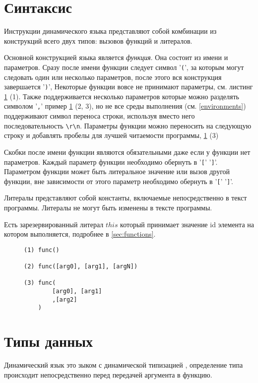\documentclass[../index.tex]{subfiles}
\begin{document}
\section{Синтаксис}

Инструкции динамического языка представляют собой комбинации из конструкций всего двух типов: вызовов функций и литералов.

Основной конструкцией языка является \textit{функция}. Она состоит из имени и параметров. 
Сразу после имени функции следует символ '\verb|(|', за которым могут следовать один или 
несколько параметров, после этого вся конструкция завершается '\verb|)|', 
Некоторые функции вовсе не принимают параметры, см. листинг \ref{lst:lecsic} (1). 
Также поддерживается несколько параметров которые можно разделять символом '\verb|,|'
пример \ref{lst:lecsic} (2, 3), но не все среды выполнения (см. \autoref{environments}) 
поддерживают символ переноса строки, используя вместо него последовательность \verb|\r\n|.
Параметры функции можно переносить на следующую строку и добавлять пробелы для 
лучшей читаемости программы, \ref{lst:lecsic} (3)

Скобки после имени функции являются обязательными даже если у функции нет параметров.
Каждый параметр функции необходимо обернуть в '\verb|[|' '\verb|]|'.
Параметром функции может быть литеральное значение или вызов другой функции, вне зависимости от этого 
параметр необходимо обернуть в '\verb|[|' '\verb|]|'.

Литералы представляют собой константы, включаемые непосредственно в текст программы. 
Литералы не могут быть изменены в тексте программы.

Есть зарезервированный литерал $this$ который принимает значение id элемента на котором выполняется, 
подробнее в \autoref{sec:functions}.

\begin{figure}\label{lst:lecsic}
\begin{verbatim}
(1) func()

(2) func([arg0], [arg1], [argN])

(3) func(
        [arg0], [arg1]
        ,[arg2]
    )
\end{verbatim}        
\end{figure}

\section{Типы данных}\label{sec:types}

Динамический язык это зыком с динамической типизацией \footnotemark, определение типа происходит 
непосредственно перед передачей аргумента в функцию. 
\end{document}
